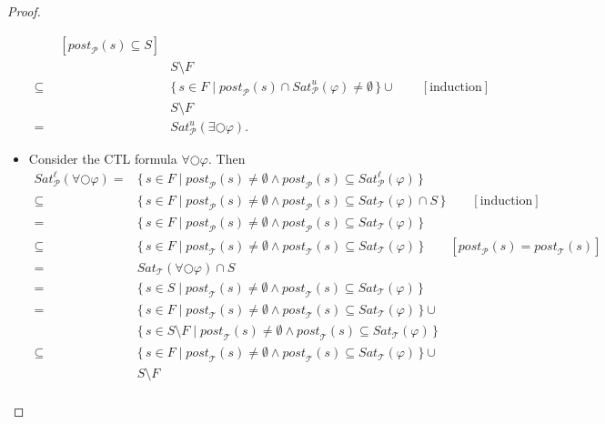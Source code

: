 \documentclass[12pt]{article}
\newcommand{\nxt}{\bigcirc}
\theoremstyle{definition}
\newcommand{\comment}[1]{\hspace{2em}[\mbox{#1}]}
\begin{document}
\begin{proof}
\begin{itemize}
\begin{align*}
\comment{$\mathit{post}_{\mathcal{P}}(s) \subseteq S$}\\
& S \setminus F\\
\subseteq & \{\, s \in F \mid \mathit{post}_{\mathcal{P}}(s) \cap \mathit{Sat}^u_{\mathcal{P}}(\varphi) \not= \emptyset \,\} \cup
\comment{induction}\\
& S \setminus F\\
= & \mathit{Sat}^u_{\mathcal{P}}(\exists \nxt \varphi).
\end{align*}
\item
Consider the CTL formula $\forall \nxt \varphi$.  Then
\begin{align*}
\mathit{Sat}^{\ell}_{\mathcal{P}}(\forall \nxt \varphi)
= & \{\, s \in F \mid \mathit{post}_{\mathcal{P}}(s) \not= \emptyset \wedge \mathit{post}_{\mathcal{P}}(s) \subseteq \mathit{Sat}^{\ell}_{\mathcal{P}}(\varphi) \,\}\\
\subseteq & \{\, s \in F \mid \mathit{post}_{\mathcal{P}}(s) \not= \emptyset \wedge \mathit{post}_{\mathcal{P}}(s) \subseteq \mathit{Sat}_{\mathcal{T}}(\varphi) \cap S \,\}
\comment{induction}\\
= & \{\, s \in F \mid \mathit{post}_{\mathcal{P}}(s) \not= \emptyset \wedge \mathit{post}_{\mathcal{P}}(s) \subseteq \mathit{Sat}_{\mathcal{T}}(\varphi) \,\}\\
\subseteq & \{\, s \in F \mid \mathit{post}_{\mathcal{T}}(s) \not= \emptyset \wedge \mathit{post}_{\mathcal{T}}(s) \subseteq \mathit{Sat}_{\mathcal{T}}(\varphi) \,\}
\comment{$\mathit{post}_{\mathcal{P}}(s) = \mathit{post}_{\mathcal{T}}(s)$}\\
= & \mathit{Sat}_{\mathcal{T}}(\forall \nxt \varphi) \cap S\\
= & \{\, s \in S \mid \mathit{post}_{\mathcal{T}}(s) \not= \emptyset \wedge \mathit{post}_{\mathcal{T}}(s) \subseteq \mathit{Sat}_{\mathcal{T}}(\varphi) \,\}\\
= & \{\, s \in F \mid \mathit{post}_{\mathcal{T}}(s) \not= \emptyset \wedge \mathit{post}_{\mathcal{T}}(s) \subseteq \mathit{Sat}_{\mathcal{T}}(\varphi) \,\} \cup\\
& \{\, s \in S \setminus F \mid \mathit{post}_{\mathcal{T}}(s) \not= \emptyset \wedge \mathit{post}_{\mathcal{T}}(s) \subseteq \mathit{Sat}_{\mathcal{T}}(\varphi) \,\}\\
\subseteq & \{\, s \in F \mid \mathit{post}_{\mathcal{T}}(s) \not= \emptyset \wedge \mathit{post}_{\mathcal{T}}(s) \subseteq \mathit{Sat}_{\mathcal{T}}(\varphi) \,\} \cup\\
& S \setminus F\\

\end{align*}
\end{itemize}
\end{proof}
\end{document}
